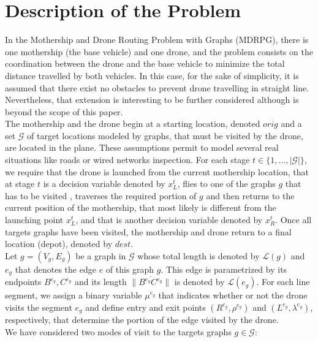 \section{Description of the Problem}
\noindent
In the Mothership and Drone Routing Problem with Graphs (MDRPG), there is one mothership (the base vehicle) and one drone, and the problem consists on the coordination between the drone and the base vehicle to minimize the total distance travelled by both vehicles. In this case, for the sake of simplicity, it is assumed that there exist no obstacles to prevent drone travelling in straight line. Nevertheless, that extension is interesting to be further considered although is beyond the scope of this paper.\\
\noindent
The mothership and the drone begin at a starting location, denoted $orig$ and a set $\mathcal G$ of target locations modeled by graphs, that must be visited by the drone, are located in the plane. These assumptions permit to model several real situations like roads or wired networks inspection.
For each stage $t \in \{1, \ldots, |\mathcal G|\}$, we require that the drone is launched from the current mothership location, that at stage $t$ is a decision variable denoted by $x_L^t$, flies to one of the graphs $g$ that has to be visited , traverses the required portion of $g$ and then returns to the current position of the mothership, that most likely is different from the launching point $x_L^t$, and  that is another decision variable denoted by $x_R^t$. Once all targets graphs have been visited, the mothership and drone return to a final location (depot), denoted by $dest$.\\
\noindent
Let $g = (V_g, E_g)$ be a graph in $\mathcal G$ whose total length is denoted by $\mathcal L(g)$ and $e_g$ that denotes the edge $e$ of this graph $g$. This edge is parametrized by its endpoints $B^{e_g}, C^{e_g}$ and its length $\|\overline{B^{e_g}C^{e_g}}\|$ is denoted by $\mathcal L(e_g)$. For each line segment, we assign a binary variable $\mu^{e_g}$ that indicates whether or not the drone visits the segment $e_g$ and define entry and exit points $(R^{e_g}, \rho^{e_g})$ and $(L^{e_g}, \lambda^{e_g})$, respectively, that determine the portion of the edge visited by the drone. \\
\noindent
We have considered two modes of visit to the targets graphs $g\in \mathcal{G}$:
